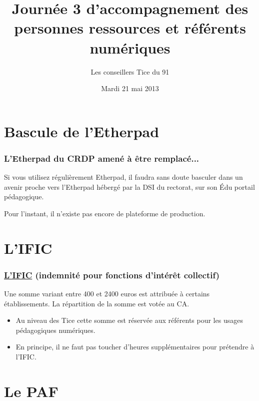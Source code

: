 \documentclass[french]{beamer}
\title[J3 d'accomp. des PR]{Journée 3 d'accompagnement des personnes ressources et référents numériques}
\author{Les conseillers Tice du 91}
\date{Mardi 21 mai 2013}
\begin{document}

\begin{frame}
\titlepage
\end{frame}


\section{Bascule de l'Etherpad}

\begin{frame}
\frametitle{L'Etherpad du CRDP amené à être remplacé...}

Si vous utilisez régulièrement Etherpad,
il faudra sans doute basculer dans un avenir proche vers l'Etherpad hébergé par la
DSI du rectorat, sur son \alert{Édu portail pédagogique}.
\bigskip

Pour l'instant, il n'existe pas encore de plateforme de production.

\end{frame}




\section{L'IFIC}


\begin{frame}%
\frametitle{\href{http://www.premiumorange.com/uasenver/elus/ific/cr_ific_25_04_2013.pdf}{L'IFIC}
(indemnité pour fonctions d'intérêt collectif)}


Une somme variant entre 400 et 2400 euros est attribuée à certains établissements.
La répartition de la somme est votée au CA.

\begin{itemize}%
\item Au niveau des Tice cette somme est réservée aux référents
pour les usages pédagogiques numériques.
\item En principe, il ne faut pas toucher d'heures supplémentaires
pour prétendre à l'IFIC.
\end{itemize}


\end{frame}




\section{Le PAF}
\end{document}
